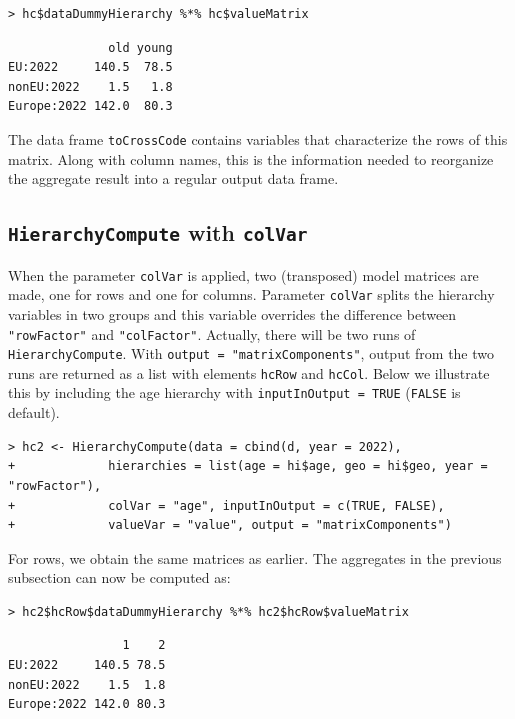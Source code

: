 \begin{verbatim}
> hc$dataDummyHierarchy %*% hc$valueMatrix
\end{verbatim}

\begin{verbatim}
              old young
EU:2022     140.5  78.5
nonEU:2022    1.5   1.8
Europe:2022 142.0  80.3
\end{verbatim}

The data frame \texttt{toCrossCode} contains variables that characterize the rows of this matrix.
Along with column names, this is the information needed to reorganize the aggregate result into a regular output data frame.

\hypertarget{hierarchycompute-with-colvar}{%
\subsection{\texorpdfstring{\texttt{HierarchyCompute} with \texttt{colVar}}{HierarchyCompute with colVar}}\label{hierarchycompute-with-colvar}}

When the parameter \texttt{colVar} is applied, two (transposed) model matrices are made,
one for rows and one for columns.
Parameter \texttt{colVar} splits the hierarchy variables in two groups and this variable overrides the difference between \texttt{"rowFactor"} and \texttt{"colFactor"}.
Actually, there will be two runs of \texttt{HierarchyCompute}.
With \texttt{output\ =\ "matrixComponents"}, output from the two runs are returned as a list with elements \texttt{hcRow} and \texttt{hcCol}.
Below we illustrate this by including the age hierarchy with \texttt{inputInOutput\ =\ TRUE} (\texttt{FALSE} is default).

\begin{verbatim}
> hc2 <- HierarchyCompute(data = cbind(d, year = 2022), 
+             hierarchies = list(age = hi$age, geo = hi$geo, year = "rowFactor"), 
+             colVar = "age", inputInOutput = c(TRUE, FALSE),
+             valueVar = "value", output = "matrixComponents")
\end{verbatim}

For rows, we obtain the same matrices as earlier. The aggregates in the previous subsection can now be computed as:

\begin{verbatim}
> hc2$hcRow$dataDummyHierarchy %*% hc2$hcRow$valueMatrix
\end{verbatim}

\begin{verbatim}
                1    2
EU:2022     140.5 78.5
nonEU:2022    1.5  1.8
Europe:2022 142.0 80.3
\end{verbatim}

